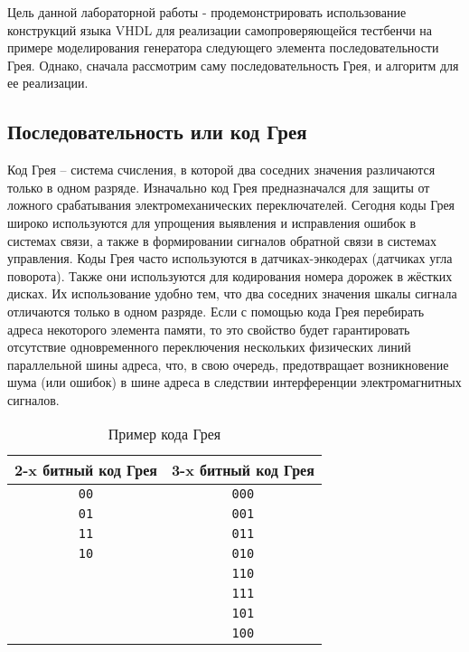 Цель данной лабораторной работы - продемонстрировать использование конструкций языка VHDL для реализации самопроверяющейся тестбенчи на примере моделирования генератора следующего элемента последовательности Грея. Однако, сначала рассмотрим саму последовательность Грея, и алгоритм для ее реализации.

\subsection{Последовательность или код Грея}
 
Код Грея – система счисления, в которой два соседних значения различаются только в одном разряде. Изначально код Грея предназначался для защиты от ложного срабатывания электромеханических переключателей. Сегодня коды Грея широко используются для упрощения выявления и исправления ошибок в системах связи, а также в формировании сигналов обратной связи в системах управления. Коды Грея часто используются в датчиках-энкодерах (датчиках угла поворота). Также они используются для кодирования номера дорожек в жёстких дисках. Их использование удобно тем, что два соседних значения шкалы сигнала отличаются только в одном разряде. Если с помощью кода Грея перебирать адреса некоторого элемента памяти, то это свойство будет гарантировать отсутствие одновременного переключения нескольких физических линий параллельной шины адреса, что, в свою очередь, предотвращает возникновение шума (или ошибок) в шине адреса в следствии интерференции электромагнитных сигналов.  

\begin{table}[h]
\centering
\begin{tabular}{|c|c|}
\hline
2-x битный код Грея & 3-x битный код Грея   \\ \hline
\texttt{00} & \texttt{000} \\
\texttt{01} & \texttt{001} \\
\texttt{11} & \texttt{011} \\
\texttt{10} & \texttt{010} \\
 & \texttt{110} \\
 & \texttt{111} \\
 & \texttt{101} \\
 & \texttt{100} \\

\hline
\end{tabular}\par
\caption{Пример кода Грея}
\label{grey_code_table_0}
\end{table}

